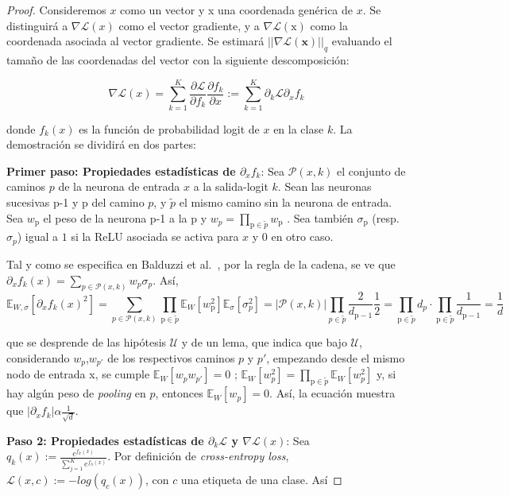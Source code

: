 \begin{proof}
Consideremos $x$ como un vector y x una coordenada genérica de $x$. Se distinguirá a \(\nabla \mathcal{L}(x)\) como el vector gradiente, y a \(\nabla \mathcal{L}(\text{x})\) como la coordenada asociada al vector gradiente. Se estimará \(||\nabla \mathcal{L}(\textbf{x})||_q\) evaluando el tamaño de las coordenadas del vector con la siguiente descomposición:

$$\nabla \mathcal{L}(x)=\sum_{k=1}^{K} \frac{\partial \mathcal{L}}{\partial f_k}\frac{\partial f_k}{\partial x}:=\sum_{k=1}^{K} \partial_k \mathcal{L} \partial_x f_k$$

donde $f_k(x)$ es la función de probabilidad logit de $x$ en la clase $k$.
La demostración se dividirá en dos partes:

\textbf{Primer paso: Propiedades estadísticas de $\partial_x f_k$}: Sea $\mathcal{P}(x,k)$ el conjunto de caminos $p$ de la neurona de entrada $x$ a la salida-logit $k$. Sean las neuronas sucesivas p-1 y p del camino $p$, y $\tilde{p}$ el mismo camino sin la neurona de entrada. Sea $w_{\text{p}}$ el peso de la neurona p-1 a la p y $w_p=\prod_{\text{p}\in \tilde{p}} w_{\text{p}}$ . Sea también $\sigma_\text{p}$ (resp. $\sigma_p$) igual a $1$ si la ReLU asociada se activa para $x$ y $0$ en otro caso.

Tal y como se especifica en Balduzzi et al.~\cite{BalduzziLAdvers}, por la regla de la cadena, se ve que $\partial_x f_k(x)=\sum_{p \in \mathcal{P}(x,k)} w_p \sigma_p$. Así,
$$\mathbb{E}_{W,\sigma}[\partial_x f_k(x)^2]=\sum_{p \in \mathcal{P}(x,k)} \prod_{\text{p} \in \tilde{p}} \mathbb{E}_W[w_\text{p}^2]\mathbb{E}_{\sigma}[\sigma_p^2] = |\mathcal{P}(x,k)|\prod_{p \in \tilde{p}} \frac{2}{d_{\text{p}-1}}\frac{1}{2}=\prod_{\text{p} \in \tilde{p}} d_p \cdot \prod_{\text{p}\in \tilde{p}} \frac{1}{d_{\text{p}-1}}=\frac{1}{d}$$

que se desprende de las hipótesis $\mathcal{U}$ y de un lema, que indica que bajo $\mathcal{U}$, considerando $w_p$,$w_{p'}$ de los respectivos caminos $p$ y $p'$, empezando desde el mismo nodo de entrada x, se cumple $\mathbb{E}_W[w_p w_{p'}]=0 \text{ ; } \mathbb{E}_W[w_p^2]=\prod_{\text{p} \in \tilde{p}} \mathbb{E}_W[w_p^2]$ y, si hay algún peso de \textit{pooling} en $p$, entonces $\mathbb{E}_W[w_p]=0$. Así, la ecuación muestra que $|\partial_x f_k| \alpha \frac{1}{\sqrt{d}}$.

\textbf{Paso 2: Propiedades estadísticas de $\partial_k \mathcal{L}$ y $\nabla \mathcal{L}(x)$}: Sea $q_k(x):=\frac{e^{f_k(x)}}{\sum_{j=1}^{K} e^{f_h(x)}}$. Por definición de \textit{cross-entropy loss}, $\mathcal{L}(x,c):=-log(q_c(x))$, con $c$ una etiqueta de una clase. Así


\end{proof}
